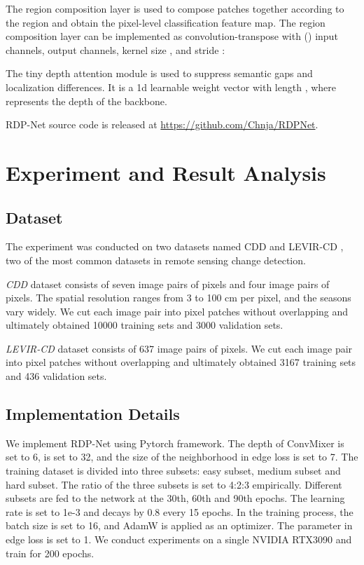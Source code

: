 \documentclass[lettersize,journal]{IEEEtran}
\begin{document}
The region composition layer is used to compose patches together according to the region and obtain the pixel-level classification feature map.
The region composition layer can be implemented as convolution-transpose with  () input channels,  output channels, kernel size , and stride :


The tiny depth attention module is used to suppress semantic gaps and localization differences.
It is a 1d learnable weight vector with length , where  represents the depth of the backbone.


RDP-Net source code is released at \url{https://github.com/Chnja/RDPNet}.

\section{Experiment and Result Analysis}

\subsection{Dataset}

The experiment was conducted on two datasets named CDD \cite{lebedev2018change} and LEVIR-CD \cite{Chen2020}, two of the most common datasets in remote sensing change detection.

\textit{CDD} dataset consists of seven image pairs of  pixels and four image pairs of  pixels.
The spatial resolution ranges from 3 to 100 cm per pixel, and the seasons vary widely.
We cut each image pair into  pixel patches without overlapping and ultimately obtained 10000 training sets and 3000 validation sets.

\textit{LEVIR-CD} dataset consists of 637 image pairs of  pixels.
We cut each image pair into  pixel patches without overlapping and ultimately obtained 3167 training sets and 436 validation sets.

\subsection{Implementation Details}

We implement RDP-Net using Pytorch framework.
The depth of ConvMixer is set to 6,  is set to 32, and the size of the neighborhood in edge loss is set to 7.
The training dataset is divided into three subsets: easy subset, medium subset and hard subset.
The ratio of the three subsets is set to 4:2:3 empirically.
Different subsets are fed to the network at the 30th, 60th and 90th epochs.
The learning rate is set to 1e-3 and decays by 0.8 every 15 epochs.
In the training process, the batch size is set to 16, and AdamW \cite{loshchilov2017decoupled} is applied as an optimizer.
The parameter  in edge loss is set to 1.
We conduct experiments on a single NVIDIA RTX3090 and train for 200 epochs.
\end{document}
